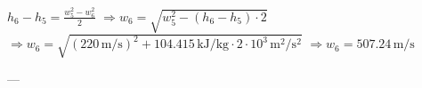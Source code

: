 \( h_6 - h_5 = \frac{w_5^2 - w_6^2}{2} \)  
\(\Rightarrow w_6 = \sqrt{w_5^2 - (h_6 - h_5) \cdot 2} \)  
\(\Rightarrow w_6 = \sqrt{(220 \, \text{m/s})^2 + 104.415 \, \text{kJ/kg} \cdot 2 \cdot 10^3 \, \text{m}^2/\text{s}^2} \)  
\(\Rightarrow w_6 = 507.24 \, \text{m/s} \)  

---